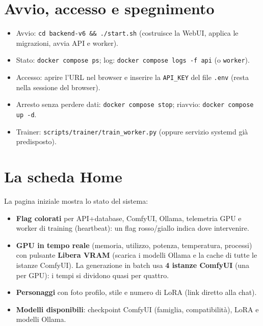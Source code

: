 \documentclass[11pt,a4paper]{article}
\begin{document}
\section{Avvio, accesso e spegnimento}
\begin{itemize}
  \item Avvio: \texttt{cd backend-v6 \&\& ./start.sh} (costruisce la WebUI, applica le migrazioni, avvia API e worker).
  \item Stato: \texttt{docker compose ps}; log: \texttt{docker compose logs -f api} (o \texttt{worker}).
  \item Accesso: aprire l'URL nel browser e inserire la \texttt{API\_KEY} del file \texttt{.env} (resta nella sessione del browser).
  \item Arresto senza perdere dati: \texttt{docker compose stop}; riavvio: \texttt{docker compose up -d}.
  \item Trainer: \texttt{scripts/trainer/train\_worker.py} (oppure servizio systemd gi\`a predisposto).
\end{itemize}

\section{La scheda Home}
La pagina iniziale mostra lo stato del sistema:
\begin{itemize}
  \item \textbf{Flag colorati} per API+database, ComfyUI, Ollama, telemetria GPU e worker di training (heartbeat): un flag rosso/giallo indica dove intervenire.
  \item \textbf{GPU in tempo reale} (memoria, utilizzo, potenza, temperatura, processi) con pulsante \textbf{Libera VRAM} (scarica i modelli Ollama e la cache di tutte le istanze ComfyUI). La generazione in batch usa \textbf{4 istanze ComfyUI} (una per GPU): i tempi si dividono quasi per quattro.
  \item \textbf{Personaggi} con foto profilo, stile e numero di LoRA (link diretto alla chat).
  \item \textbf{Modelli disponibili}: checkpoint ComfyUI (famiglia, compatibilit\`a), LoRA e modelli Ollama.
\end{itemize}
\end{document}

